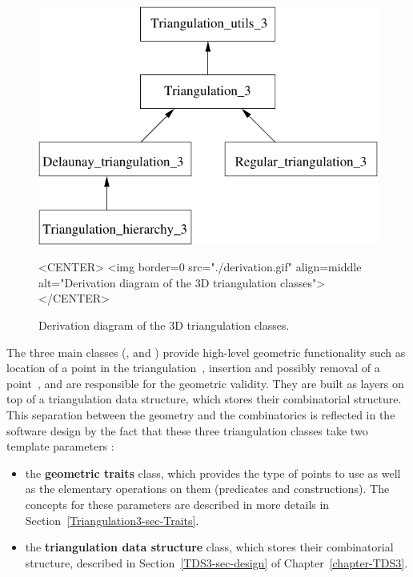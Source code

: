 \begin{figure}[htbp]
\begin{ccTexOnly}
\begin{center} 
\includegraphics{Triangulation_3/derivation} 
\end{center}
\end{ccTexOnly}
\begin{ccHtmlOnly}
<CENTER>
<img border=0 src="./derivation.gif" align=middle
alt="Derivation diagram of the 3D triangulation classes"> 
</CENTER>
\end{ccHtmlOnly}
\caption{Derivation diagram of the 3D triangulation classes.
\label{t3_derivation}}
\end{figure} 

The three main classes (, 
and ) provide high-level geometric functionality
such as location of a point in the triangulation~\cite{cgal:dpt-wt-02}, insertion
and possibly removal of a point~\cite{cgal:dt-pvr3d-03}, and are responsible for the
geometric validity.  They are built as layers on top of a triangulation data
structure, which stores their combinatorial structure.  This separation between
the geometry and the combinatorics is reflected in the software design by the
fact that these three triangulation classes take two template parameters :

\begin{itemize}
\item {} the \textbf{geometric traits} class, which provides the type of points
to use as well as the elementary operations on them (predicates and
constructions).  The concepts for these parameters are described in more
details in Section~\ref{Triangulation3-sec-Traits}.
\item {} the \textbf{triangulation data structure} class, which stores their
combinatorial structure, described in Section~\ref{TDS3-sec-design} of
Chapter~\ref{chapter-TDS3}.
\end{itemize}

